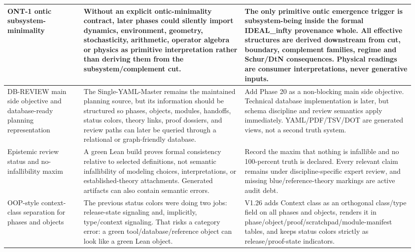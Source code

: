 \begin{longtable}{L{0.18\linewidth} L{0.38\linewidth} L{0.4\linewidth}}
\hline
\addlinespace[0.24em]
ONT-1 ontic subsystem-minimality & Without an explicit ontic-minimality contract, later phases could silently import dynamics, environment, geometry, stochasticity, arithmetic, operator algebra or physics as primitive interpretation rather than deriving them from the subsystem/\allowbreak{}complement cut. & The only primitive ontic emergence trigger is subsystem-being inside the formal IDEAL\_infty provenance whole. All effective structures are derived downstream from cut, boundary, complement families, regime and Schur/\allowbreak{}DtN consequences. Physical readings are consumer interpretations, never generative inputs.\\
\hline
\addlinespace[0.24em]
DB-REVIEW main side objective and database-ready planning representation & The Single-YAML-Master remains the maintained planning source, but its information should be structured so phases, objects, modules, handoffs, status colors, theory links, proof dossiers, and review paths can later be queried through a relational or graph-friendly database. & Add Phase 20 as a non-blocking main side objective. Technical database implementation is later, but schema discipline and review semantics apply immediately. YAML/\allowbreak{}PDF/\allowbreak{}TSV/\allowbreak{}DOT are generated views, not a second truth system.\\
\hline
\addlinespace[0.24em]
Epistemic review status and no-infallibility maxim & A green Lean build proves formal consistency relative to selected definitions, not semantic infallibility of modeling choices, interpretations, or established-theory attachments. Generated artifacts can also contain semantic errors. & Record the maxim that nothing is infallible and no 100-percent truth is declared. Every relevant claim remains under discipline-specific expert review, and missing blue/\allowbreak{}reference-theory markings are active audit debt.\\
\hline
\addlinespace[0.24em]
OOP-style context-class separation for phases and objects & The previous status colors were doing two jobs: release-state signaling and, implicitly, type/\allowbreak{}context signaling. That risks a category error: a green tool/\allowbreak{}database/\allowbreak{}reference object can look like a green Lean object. & V1.26 adds Context class as an orthogonal class/\allowbreak{}type field on all phases and objects, renders it in phase/\allowbreak{}object/\allowbreak{}proof/\allowbreak{}scratchpad/\allowbreak{}module-manifest tables, and keeps status colors strictly as release/\allowbreak{}proof-state indicators.\\

\end{longtable}
